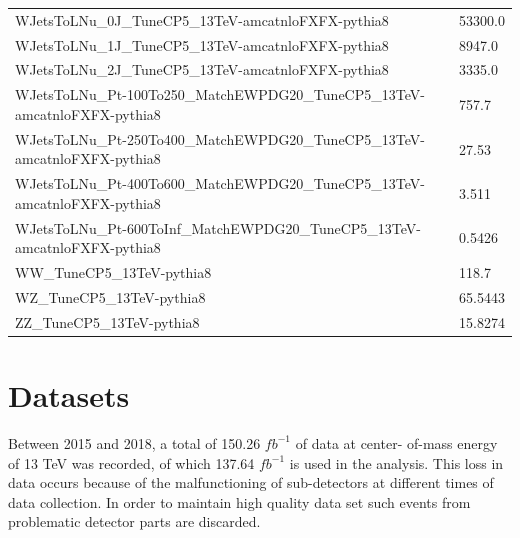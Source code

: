 \begin{table}
{\begin{tabular}{ll}
WJetsToLNu\_0J\_TuneCP5\_13TeV-amcatnloFXFX-pythia8 & 53300.0 \\ 
WJetsToLNu\_1J\_TuneCP5\_13TeV-amcatnloFXFX-pythia8 & 8947.0 \\ 
WJetsToLNu\_2J\_TuneCP5\_13TeV-amcatnloFXFX-pythia8 & 3335.0 \\ 
WJetsToLNu\_Pt-100To250\_MatchEWPDG20\_TuneCP5\_13TeV-amcatnloFXFX-pythia8 & 757.7 \\ 
WJetsToLNu\_Pt-250To400\_MatchEWPDG20\_TuneCP5\_13TeV-amcatnloFXFX-pythia8 & 27.53 \\ 
WJetsToLNu\_Pt-400To600\_MatchEWPDG20\_TuneCP5\_13TeV-amcatnloFXFX-pythia8 & 3.511 \\ 
WJetsToLNu\_Pt-600ToInf\_MatchEWPDG20\_TuneCP5\_13TeV-amcatnloFXFX-pythia8 & 0.5426 \\ \hline 
WW\_TuneCP5\_13TeV-pythia8 & 118.7 \\ 
WZ\_TuneCP5\_13TeV-pythia8 & 65.5443 \\ 
ZZ\_TuneCP5\_13TeV-pythia8 & 15.8274 \\ \hline

\hline

\end{tabular}}
\label{tab:bkg_table}
\end{table}


\section{Datasets}
Between 2015 and 2018, a total of 150.26 $fb^{-1}$ of data at center- of-mass energy of 13 TeV was recorded, of which 137.64 $fb^{-1}$ is used in the analysis. This loss in data occurs because of the malfunctioning of sub-detectors at different times of data collection. In order to maintain high quality data set such events from problematic detector parts are discarded.


